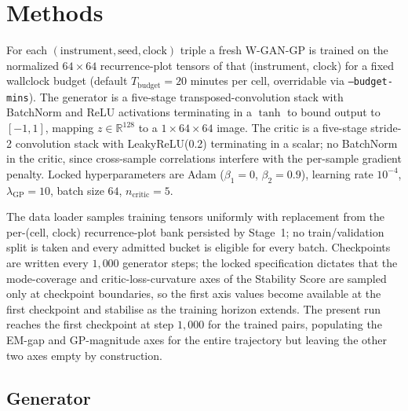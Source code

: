 \section{Methods}
\label{sec:methods}

For each $(\text{instrument}, \text{seed}, \text{clock})$ triple a
fresh W-GAN-GP is trained on the normalized $64 \times 64$
recurrence-plot tensors of that (instrument, clock) for a fixed
wallclock budget (default $T_{\text{budget}} = 20$ minutes per cell,
overridable via \texttt{--budget-mins}). The generator is a
five-stage transposed-convolution stack with BatchNorm and ReLU
activations terminating in a $\tanh$ to bound output to $[-1, 1]$,
mapping $z \in \mathbb{R}^{128}$ to a $1 \times 64 \times 64$ image.
The critic is a five-stage stride-2 convolution stack with
LeakyReLU(0.2) terminating in a scalar; no BatchNorm in the critic,
since cross-sample correlations interfere with the per-sample
gradient penalty. Locked hyperparameters are Adam ($\beta_1 = 0$,
$\beta_2 = 0.9$), learning rate $10^{-4}$, $\lambda_{\mathrm{GP}} =
10$, batch size $64$, $n_{\text{critic}} = 5$.

The data loader samples training tensors uniformly with replacement
from the per-(cell, clock) recurrence-plot bank persisted by Stage~1;
no train/validation split is taken and every admitted bucket is
eligible for every batch. Checkpoints are written every $1{,}000$
generator steps; the locked specification dictates that the
mode-coverage and critic-loss-curvature axes of the Stability Score
are sampled only at checkpoint boundaries, so the first axis values
become available at the first checkpoint and stabilise as the
training horizon extends. The present run reaches the first
checkpoint at step $1{,}000$ for the trained pairs, populating the
EM-gap and GP-magnitude axes for the entire trajectory but leaving
the other two axes empty by construction.

\subsection*{Generator}
\begin{center}
\scalebox{0.75}{}
\end{center}

